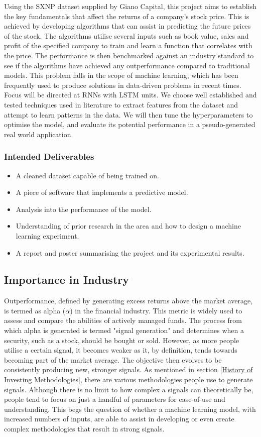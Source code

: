 \documentclass[10pt,onecolumn,letterpaper]{article}
\begin{document}
Using the SXNP dataset supplied by Giano Capital, this project aims to establish the key fundamentals that affect the returns of a company's stock price. This is achieved by developing algorithms that can assist in predicting the future prices of the stock. The algorithms utilise several inputs such as book value, sales and profit of the specified company to train and learn a function that correlates with the price. The performance is then benchmarked against an industry standard to see if the algorithms have achieved any outperformance compared to traditional models. This problem falls in the scope of machine learning, which has been frequently used to produce solutions in data-driven problems in recent times. Focus will be directed at RNNs with LSTM units. We choose well established and tested techniques used in literature to extract features from the dataset and attempt to learn patterns in the data. We will then tune the hyperparameters to optimise the model, and evaluate its potential performance in a pseudo-generated real world application. 

\subsubsection{Intended Deliverables} \label{Intended Deliverables}
\begin{itemize}
	\item A cleaned dataset capable of being trained on. 
	\item A piece of software that implements a predictive model. 
	\item Analysis into the performance of the model.
	\item Understanding of prior research in the area and how to design a machine learning experiment. 
	\item A report and poster summarising the project and its experimental results.
\end{itemize}

\subsection{Importance in Industry} 

Outperformance, defined by generating excess returns above the market average, is termed as alpha ($\alpha$) in the financial industry. This metric is widely used to assess and compare the abilities of actively managed funds. The process from which alpha is generated is termed "signal generation" and determines when a security, such as a stock, should be bought or sold. However, as more people utilise a certain signal, it becomes weaker as it, by definition, tends towards becoming part of the market average. The objective then evolves to be consistently producing new, stronger signals. As mentioned in section \ref{History of Investing Methodologies}, there are various methodologies people use to generate signals. Although there is no limit to how complex a signals can theoretically be, people tend to focus on just a handful of parameters for ease-of-use and understanding. This begs the question of whether a machine learning model, with increased numbers of inputs, are able to assist in developing or even create complex methodologies that result in strong signals.  
\end{document}
